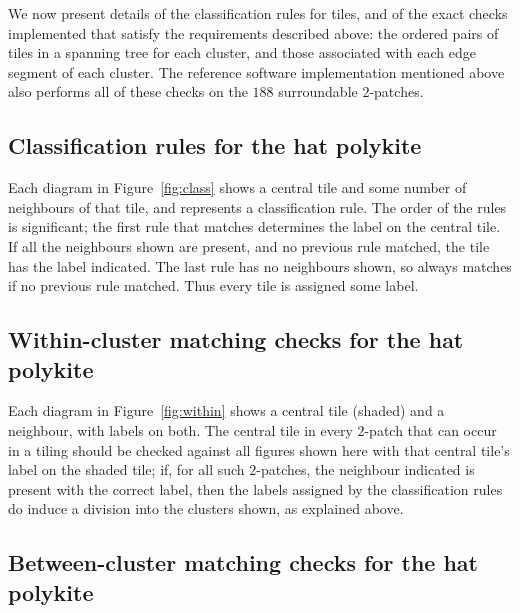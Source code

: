 We now present details of the classification rules for tiles, and of
the exact checks implemented that satisfy the requirements described
above: the ordered pairs of tiles in a spanning tree for each cluster,
and those associated with each edge segment of each cluster.
The reference software implementation mentioned above also performs
all of these checks on the $188$ surroundable $2$-patches.

\FloatBarrier

\subsection{Classification rules for the hat polykite}
\label{sec:clusters:rules}

Each diagram in Figure~\ref{fig:class} shows a central tile and some
number of neighbours of that tile, and represents a classification
rule.  The order of the rules is significant; the first rule that
matches determines the label on the central tile.  If all the
neighbours shown are present, and no previous rule matched, the tile
has the label indicated.  The last rule has no neighbours shown, so
always matches if no previous rule matched. Thus every tile is assigned
some label.



\FloatBarrier

\subsection{Within-cluster matching checks for the hat polykite}
\label{sec:clusters:within}

Each diagram in Figure~\ref{fig:within} shows a central tile (shaded)
and a neighbour, with labels on both.  The central tile in every
$2$-patch that can occur in a tiling should be checked against all
figures shown here with that central tile's label on the shaded tile;
if, for all such $2$-patches, the neighbour indicated is present with
the correct label, then the labels assigned by the classification
rules do induce a division into the clusters shown, as explained
above.



\FloatBarrier

\subsection{Between-cluster matching checks for the hat polykite}
\label{sec:clusters:between}

